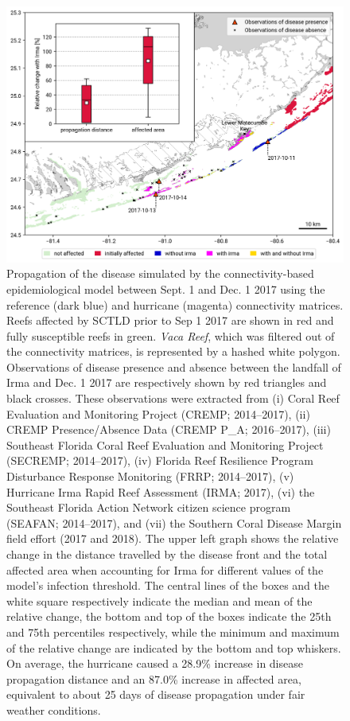 \documentclass[fleqn,10pt]{wlscirep}
\newcommand{\modif}[1]{{#1}}
\begin{document}
\begin{figure}[tbp]
    \centering
    \includegraphics[width=.8\textwidth]{figures/propagation_boxplot_obs.png}
    \caption{
        Propagation of the disease simulated by the connectivity-based epidemiological model between Sept. 1 and Dec. 1 2017 using the reference (\modif{dark blue}) and hurricane (\modif{magenta}) connectivity matrices. Reefs affected by SCTLD prior to Sep 1 2017 are shown in red and fully susceptible reefs in green. \modif{\textit{Vaca Reef}, which was filtered out of the connectivity matrices, is represented by a hashed white polygon. Observations of disease presence and absence between the landfall of Irma and Dec. 1 2017 are respectively shown by red triangles and black crosses. These observations were extracted from (i) Coral Reef Evaluation and Monitoring Project (CREMP; 2014–2017), (ii) CREMP Presence/Absence Data (CREMP P\_A; 2016–2017), (iii) Southeast Florida Coral Reef Evaluation and Monitoring Project (SECREMP; 2014–2017), (iv) Florida Reef Resilience Program Disturbance Response Monitoring (FRRP; 2014–2017), (v) Hurricane Irma Rapid Reef Assessment (IRMA; 2017), (vi) the Southeast Florida Action Network citizen science program (SEAFAN; 2014–2017), and (vii) the Southern Coral Disease Margin field effort (2017 and 2018)}. The upper left graph shows the relative change in the distance travelled by the disease front and the total affected area when accounting for Irma \modif{for} different values of the model's infection threshold. The central lines of the boxes and the white square respectively indicate the median and mean of the relative change, the bottom and \modif{top} of the boxes indicate the 25th and 75th percentiles respectively, while the minimum and maximum of the relative change are indicated by the bottom and top whiskers. On average, the hurricane caused  a 28.9\% increase in disease propagation distance and an 87.0\% increase in affected area, equivalent to about 25 days of disease propagation under fair weather conditions.
    }\label{fig:propagation}
\end{figure}
\end{document}
